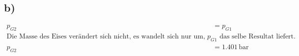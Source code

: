 

\subsection*{b)}

\begin{align*}
    p_{G2} &= p_{G1} \\
    \text{Die Masse des Eises verändert sich nicht, es wandelt sich nur um, was dazu führt, dass die oben benutzte Formel für den nicht veränderten Druck } p_{G1} \text{ das selbe Resultat liefert.} \\
    p_{G2} &= \boxed{1.401 \, \text{bar}}
\end{align*}